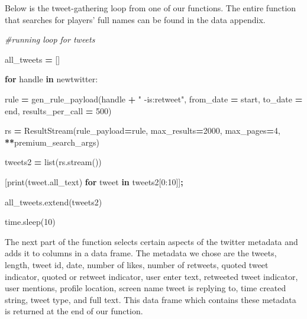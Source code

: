 \documentclass[12pt,twoside]{reedthesis}
\newenvironment{Shaded}{\begin{snugshade}}{\end{snugshade}}
\newcommand{\KeywordTok}[1]{\textcolor[rgb]{0.13,0.29,0.53}{\textbf{#1}}}
\newcommand{\DecValTok}[1]{\textcolor[rgb]{0.00,0.00,0.81}{#1}}
\newcommand{\StringTok}[1]{\textcolor[rgb]{0.31,0.60,0.02}{#1}}
\newcommand{\CommentTok}[1]{\textcolor[rgb]{0.56,0.35,0.01}{\textit{#1}}}
\newcommand{\ControlFlowTok}[1]{\textcolor[rgb]{0.13,0.29,0.53}{\textbf{#1}}}
\newcommand{\OperatorTok}[1]{\textcolor[rgb]{0.81,0.36,0.00}{\textbf{#1}}}
\newcommand{\BuiltInTok}[1]{#1}
\newcommand{\NormalTok}[1]{#1}
\begin{document}
Below is the tweet-gathering loop from one of our functions. The entire
function that searches for players' full names can be found in the data
appendix.

\small
\begin{Shaded}
\begin{Highlighting}[]
\CommentTok{#running loop for tweets}
    
\NormalTok{    all_tweets }\OperatorTok{=}\NormalTok{ []}

    \ControlFlowTok{for}\NormalTok{ handle }\KeywordTok{in}\NormalTok{ newtwitter:}

\NormalTok{        rule }\OperatorTok{=}\NormalTok{ gen_rule_payload(handle }\OperatorTok{+} \StringTok{" -is:retweet"}\NormalTok{,}
\NormalTok{                                from_date }\OperatorTok{=}\NormalTok{ start,}
\NormalTok{                                to_date }\OperatorTok{=}\NormalTok{ end,}
\NormalTok{                                results_per_call }\OperatorTok{=} \DecValTok{500}\NormalTok{)}
            
\NormalTok{        rs }\OperatorTok{=}\NormalTok{ ResultStream(rule_payload}\OperatorTok{=}\NormalTok{rule,}
\NormalTok{                          max_results}\OperatorTok{=}\DecValTok{2000}\NormalTok{,}
\NormalTok{                          max_pages}\OperatorTok{=}\DecValTok{4}\NormalTok{,}
                          \OperatorTok{**}\NormalTok{premium_search_args)}

\NormalTok{        tweets2 }\OperatorTok{=} \BuiltInTok{list}\NormalTok{(rs.stream())}

\NormalTok{        [}\BuiltInTok{print}\NormalTok{(tweet.all_text) }\ControlFlowTok{for}\NormalTok{ tweet }\KeywordTok{in}\NormalTok{ tweets2[}\DecValTok{0}\NormalTok{:}\DecValTok{10}\NormalTok{]]}\OperatorTok{;}
        
\NormalTok{        all_tweets.extend(tweets2)}
        
\NormalTok{        time.sleep(}\DecValTok{10}\NormalTok{)}
\end{Highlighting}
\end{Shaded}
\normalsize

The next part of the function selects certain aspects of the twitter
metadata and adds it to columns in a data frame. The metadata we chose
are the tweets, length, tweet id, date, number of likes, number of
retweets, quoted tweet indicator, quoted or retweet indicator, user
enter text, retweeted tweet indicator, user mentions, profile location,
screen name tweet is replying to, time created string, tweet type, and
full text. This data frame which contains these metadata is returned at
the end of our function.
\end{document}

